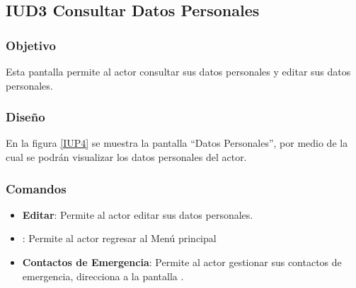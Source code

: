 \subsection{IUD3 Consultar Datos Personales}
 
\subsubsection{Objetivo}

    Esta pantalla permite al actor consultar sus datos personales y editar sus datos personales.

\subsubsection{Diseño}

    En la figura \ref{IUP4} se muestra la pantalla ``Datos Personales'', por medio de la cual se podrán visualizar los datos personales del actor. \\


\subsubsection{Comandos}
\begin{itemize}
    \item \textbf{Editar}: Permite al actor editar sus datos personales.
    \item {}: Permite al actor regresar al Menú principal
    \item \textbf{Contactos de Emergencia}: Permite al actor gestionar sus contactos de emergencia, direcciona a la pantalla .
\end{itemize}

%
